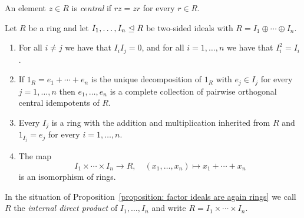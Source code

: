 \begin{definition}
  An element $z \in R$ is \emph{central} if $rz = zr$ for every $r \in R$.
\end{definition}


\begin{proposition}
  \label{proposition: factor ideals are again rings}
  Let $R$ be a ring and let $I_1, \dotsc, I_n \trianglelefteq R$ be two-sided ideals with $R = I_1 \oplus \dotsb \oplus I_n$.
  \begin{enumerate}
    \item
      For all $i \neq j$ we have that $I_i I_j = 0$, and for all $i = 1, \dotsc, n$ we have that $I_i^2 = I_i$.
    \item
      If $1_R = e_1 + \dotsb + e_n$ is the unique decomposition of $1_R$ with $e_j \in I_j$ for every $j = 1, \dotsc, n$ then $e_1, \dotsc, e_n$ is a complete collection of pairwise orthogonal central idempotents of $R$. 
    \item
      Every $I_j$ is a ring with the addition and multiplication inherited from $R$ and $1_{I_j} = e_j$ for every $i = 1, \dotsc, n$.
    \item
      The map
      \[
            I_1 \times \dotsb \times I_n
        \to R,
        \quad   (x_1, \dotsc, x_n)
        \mapsto x_1 + \dotsb + x_n
      \]
      is an isomorphism of rings.
  \end{enumerate}
\end{proposition}




\begin{definition}
  \label{definition: internal direct product of rings}
  In the situation of Proposition~\ref{proposition: factor ideals are again rings} we call $R$ the \emph{internal direct product} of $I_1, \dotsc, I_n$ and write $R = I_1 \times \dotsb \times I_n$.
\end{definition}


